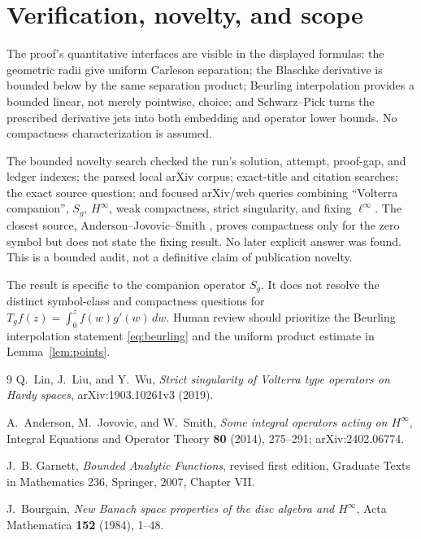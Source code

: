 \documentclass[11pt]{article}
\begin{document}
\section{Verification, novelty, and scope}

The proof's quantitative interfaces are visible in the displayed formulas:
the geometric radii give uniform Carleson separation; the Blaschke derivative
is bounded below by the same separation product; Beurling interpolation
provides a bounded linear, not merely pointwise, choice; and Schwarz--Pick
turns the prescribed derivative jets into both embedding and operator lower
bounds.  No compactness characterization is assumed.

The bounded novelty search checked the run's solution, attempt, proof-gap,
and ledger indexes; the parsed local arXiv corpus; exact-title and citation
searches; the exact source question; and focused arXiv/web queries combining
``Volterra companion'', $S_g$, $H^\infty$, weak compactness, strict
singularity, and fixing $\ell^\infty$.  The closest source,
Anderson--Jovovic--Smith \cite{AJS}, proves compactness only for the zero
symbol but does not state the fixing result.  No later explicit answer was
found.  This is a bounded audit, not a definitive claim of publication
novelty.

The result is specific to the companion operator $S_g$.  It does not resolve
the distinct symbol-class and compactness questions for
$T_gf(z)=\int_0^z f(w)g'(w)\,dw$.  Human review should prioritize the
Beurling interpolation statement \eqref{eq:beurling} and the uniform product
estimate in Lemma~\ref{lem:points}.

\begin{thebibliography}{9}
Q.~Lin, J.~Liu, and Y.~Wu,
\emph{Strict singularity of Volterra type operators on Hardy spaces},
arXiv:1903.10261v3 (2019).

A.~Anderson, M.~Jovovic, and W.~Smith,
\emph{Some integral operators acting on $H^\infty$},
Integral Equations and Operator Theory \textbf{80} (2014), 275--291;
arXiv:2402.06774.

J.~B. Garnett,
\emph{Bounded Analytic Functions}, revised first edition,
Graduate Texts in Mathematics 236, Springer, 2007, Chapter VII.

J.~Bourgain,
\emph{New Banach space properties of the disc algebra and $H^\infty$},
Acta Mathematica \textbf{152} (1984), 1--48.
\end{thebibliography}
\end{document}
